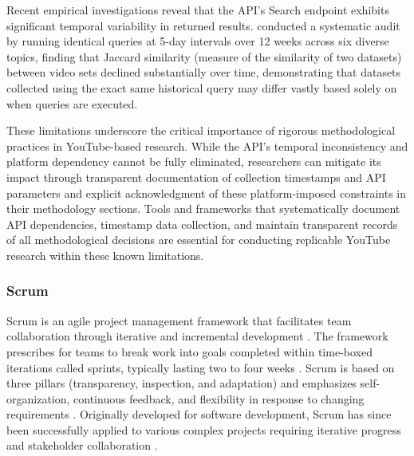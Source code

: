 Recent empirical investigations reveal that the API's Search endpoint exhibits significant temporal variability in returned results. \textcite{efstratiou2025youtube} conducted a systematic audit by running identical queries at 5-day intervals over 12 weeks across six diverse topics, finding that Jaccard similarity (measure of the similarity of two datasets) between video sets declined substantially over time, demonstrating that datasets collected using the exact same historical query may differ vastly based solely on when queries are executed.

These limitations underscore the critical importance of rigorous methodological practices in YouTube-based research. While the API's temporal inconsistency and platform dependency cannot be fully eliminated, researchers can mitigate its impact through transparent documentation of collection timestamps and API parameters and explicit acknowledgment of these platform-imposed constraints in their methodology sections. Tools and frameworks that systematically document API dependencies, timestamp data collection, and maintain transparent records of all methodological decisions are essential for conducting replicable YouTube research within these known limitations.

\subsubsection{Scrum}

Scrum is an agile project management framework that facilitates team collaboration through iterative and incremental development \parencite{schwaber2020scrum}. The framework prescribes for teams to break work into goals completed within time-boxed iterations called sprints, typically lasting two to four weeks \parencite{schwaber2020scrum}. Scrum is based on three pillars (transparency, inspection, and adaptation) and emphasizes self-organization, continuous feedback, and flexibility in response to changing requirements \parencite{schwaber2020scrum}. Originally developed for software development, Scrum has since been successfully applied to various complex projects requiring iterative progress and stakeholder collaboration \parencite{schwaber2020scrum}.
